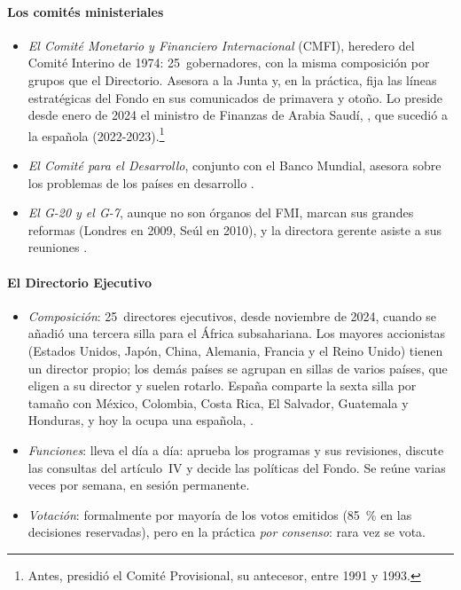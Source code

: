 \documentclass[11pt]{article}
\begin{document}
\paragraph{Los comités ministeriales}

\begin{itemize}
\item \emph{El Comité Monetario y Financiero Internacional} (CMFI), heredero del Comité Interino de 1974: 25~gobernadores, con la misma composición por grupos que el Directorio. Asesora a la Junta y, en la práctica, fija las líneas estratégicas del Fondo en sus comunicados de primavera y otoño. Lo preside desde enero de 2024 el ministro de Finanzas de Arabia Saudí, , que sucedió a la española  (2022-2023).\footnote{Antes,  presidió el Comité Provisional, su antecesor, entre 1991 y 1993.}
\item \emph{El Comité para el Desarrollo}, conjunto con el Banco Mundial, asesora sobre los problemas de los países en desarrollo .
\item \emph{El G-20 y el G-7}, aunque no son órganos del FMI, marcan sus grandes reformas (Londres en 2009, Seúl en 2010), y la directora gerente asiste a sus reuniones\nocite{ReinhartTrebesch2016} .
\end{itemize}

\paragraph{El Directorio Ejecutivo}

\begin{itemize}
\item \emph{Composición}: 25~directores ejecutivos, desde noviembre de 2024, cuando se añadió una tercera silla para el África subsahariana\nocite{FMI2024Silla25}. Los mayores accionistas (Estados Unidos, Japón, China, Alemania, Francia y el Reino Unido) tienen un director propio; los demás países se agrupan en sillas de varios países, que eligen a su director y suelen rotarlo. España comparte la sexta silla por tamaño con México, Colombia, Costa Rica, El Salvador, Guatemala y Honduras, y hoy la ocupa una española, \nocite{BdE2025FMI}.
\item \emph{Funciones}: lleva el día a día: aprueba los programas y sus revisiones, discute las consultas del artículo~IV y decide las políticas del Fondo. Se reúne varias veces por semana, en sesión permanente.
\item \emph{Votación}: formalmente por mayoría de los votos emitidos (85~\% en las decisiones reservadas), pero en la práctica \emph{por consenso}: rara vez se vota.
\end{itemize}
\end{document}

